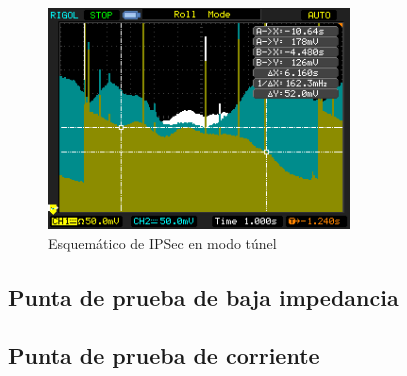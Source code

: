 \documentclass[a4paper,10pt]{article}
\begin{document}
			\begin{figure}[!htb]
				\centering
				\includegraphics[width=8cm]{Imagenes/Mediciones instrumentos/NewFile2.png}
				\caption{Esquemático de IPSec en modo t\'unel} \label{img003}
			\end{figure}						
		\subsection{Punta de prueba de baja impedancia}
		\subsection{Punta de prueba de corriente}
		
		
	


	
		
\end{document}
